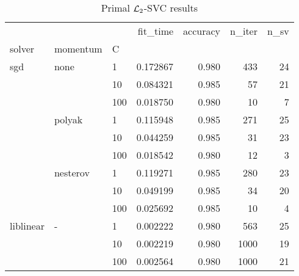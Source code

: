 \begin{table}[H]
\centering
\caption{Primal $\protect \mathcal{L}_2$-SVC results}
\label{primal_l2_svc_cv_results}
\begin{tabular}{lllrrrr}
\toprule
          &   &     &  fit\_time &  accuracy &  n\_iter &  n\_sv \\
solver & momentum & C &           &           &         &       \\
\midrule
sgd & none & 1   &  0.172867 &     0.980 &     433 &    24 \\
          &   & 10  &  0.084321 &     0.985 &      57 &    21 \\
          &   & 100 &  0.018750 &     0.980 &      10 &     7 \\
          & polyak & 1   &  0.115948 &     0.985 &     271 &    25 \\
          &   & 10  &  0.044259 &     0.985 &      31 &    23 \\
          &   & 100 &  0.018542 &     0.980 &      12 &     3 \\
          & nesterov & 1   &  0.119271 &     0.985 &     280 &    23 \\
          &   & 10  &  0.049199 &     0.985 &      34 &    20 \\
          &   & 100 &  0.025692 &     0.985 &      10 &     4 \\
liblinear & - & 1   &  0.002222 &     0.980 &     563 &    25 \\
          &   & 10  &  0.002219 &     0.980 &    1000 &    19 \\
          &   & 100 &  0.002564 &     0.980 &    1000 &    21 \\
\bottomrule
\end{tabular}
\end{table}
